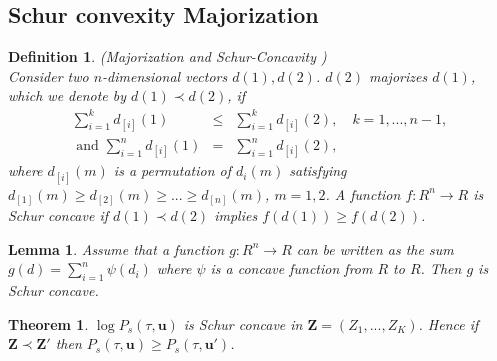 \documentclass[10pt,twocolumn,conference,final]{IEEEtran}
\newtheorem{definition}{Definition}[section]
\newtheorem{lma}{Lemma}[section]
\newtheorem{thm}{Theorem}[section]
\newcommand{\Z}{\mathbf Z}
\begin{document}
\subsection{\bf Schur convexity Majorization}
\begin{definition}
(Majorization and Schur-Concavity \cite{Marshall})
\label{majorization} \\
Consider two $n$-dimensional vectors  $ d (1), d (2)$.
$d(2)$ majorizes $ d (1)$, which we denote by $ d (1) \prec d(2) $,
if
\begin{eqnarray}
\sum_{i=1}^k  d_{[i]} (1) &\leq& \sum_{i=1}^k  d_{[i]} (2) , \quad k=1,...,n-1, \label{eq:major1}\\
\mbox{ and     }
\sum_{i=1}^n  d_{[i]} (1) &=& \sum_{i=1}^n  d_{[i]} (2),\label{eq:major2}
\end{eqnarray}
where $d_{[i]} (m)$ is a permutation of $d_i (m)$ satisfying
$d_{[1]}(m)  \geq d_{[2]} (m) \geq ... \geq d_{[n]}(m)  $, $m=1,2$.
A function $f: R^n\to R$ is Schur concave if $ d (1) \prec d(2) $
implies $f(d(1)) \geq  f(d(2))$.
\end{definition}
\bigskip
\begin{lma}\label{lemma:maj}
{\rm \cite[Proposition C.1 on p. 64]{Marshall}}
 \label{lmaM}
Assume that a function $g : R^n \to R$ can be written as the sum $g(
d ) = \sum_{i=1}^n \psi ( d_i )$ where $\psi$ is a concave function
from $R$ to $R$. Then $g$ is Schur concave.
\end{lma}
\begin{thm}\label{thm:majorpol}
$\log P_s( \tau , \mathbf u )$ is Schur concave in
$\Z = ( Z_1 , ... , Z_K ) $. Hence if $\Z \prec \Z'$ then
$ P_s( \tau , {\mathbf u} ) \geq P_s( \tau , {\mathbf u'} ) $.
\end{thm}
\end{document}
